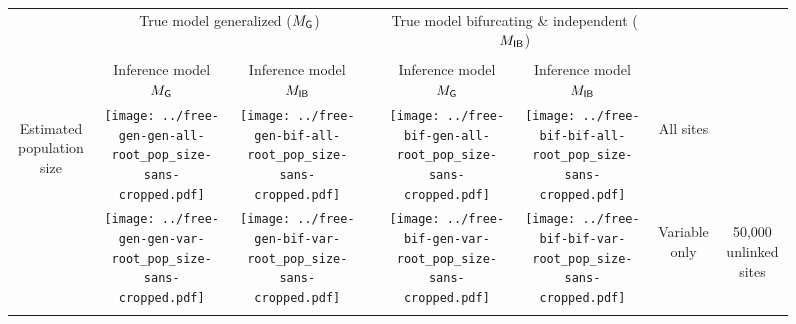 \documentclass[border=10pt,varwidth=30cm]{standalone}
\newcommand{\genmodel}{\ensuremath{M_{\textrm{\sffamily G}}}\xspace}
\newcommand{\bimodel}{\ensuremath{M_{\textrm{\sffamily IB}}}\xspace}
\begin{document}
\begin{figure}
    \setlength\arrayrulewidth{2pt}
    \centering
    \begin{tabular}{@{}cccccccc@{}}
        & \multicolumn{2}{c}{\LARGE True model generalized (\genmodel)}
        &
        & \multicolumn{2}{c}{\LARGE True model bifurcating \& independent (\bimodel)}
        &
        & \\[1ex]
        \cline{2-3}\cline{5-6}
        & & & & & & & \\
        & \multirow{1}{0.19\textwidth}{\centering\Large Inference model \genmodel}
        & \multirow{1}{0.19\textwidth}{\centering\Large Inference model \bimodel}
        &
        & \multirow{1}{0.19\textwidth}{\centering\Large Inference model \genmodel}
        & \multirow{1}{0.19\textwidth}{\centering\Large Inference model \bimodel}
        &
        & \\[4ex]
        \multirow{5}{*}[-8em]{\begin{sideways}\Large Estimated population size\end{sideways}}
        & \texttt{[image: ../free-gen-gen-all-root\_pop\_size-sans-cropped.pdf]}
        & \texttt{[image: ../free-gen-bif-all-root\_pop\_size-sans-cropped.pdf]}
        &
        & \texttt{[image: ../free-bif-gen-all-root\_pop\_size-sans-cropped.pdf]}
        & \texttt{[image: ../free-bif-bif-all-root\_pop\_size-sans-cropped.pdf]}
        & \multicolumn{1}{c|}{\multirow{1}{*}[9em]{\begin{sideways}\Large All sites\end{sideways}}}
        & \\
        & \texttt{[image: ../free-gen-gen-var-root\_pop\_size-sans-cropped.pdf]}
        & \texttt{[image: ../free-gen-bif-var-root\_pop\_size-sans-cropped.pdf]}
        &
        & \texttt{[image: ../free-bif-gen-var-root\_pop\_size-sans-cropped.pdf]}
        & \texttt{[image: ../free-bif-bif-var-root\_pop\_size-sans-cropped.pdf]}
        & \multicolumn{1}{c|}{\multirow{1}{*}[10em]{\begin{sideways}\Large Variable only\end{sideways}}}
        & \multirow{2}{*}[19em]{\begin{sideways}\LARGE 50,000 unlinked sites\end{sideways}} \\
        & & & & & & & \\

\end{tabular}
\end{figure}
\end{document}
